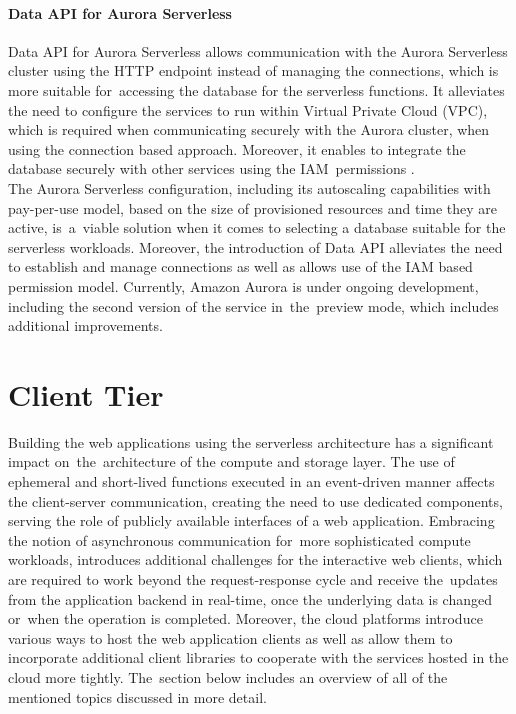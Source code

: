 \paragraph{Data API for Aurora Serverless}

Data API for Aurora Serverless allows communication with the Aurora Serverless cluster using the HTTP endpoint instead of managing the connections, which is more suitable for~accessing the database for the serverless functions.
It alleviates the need to configure the services to run within Virtual Private Cloud (VPC), which is required when communicating securely with the Aurora cluster, when using the connection based approach.
Moreover, it enables to integrate the database securely with other services using the IAM~permissions \cite{AuroraServerlessDataAPI}. \\

The Aurora Serverless configuration, including its autoscaling capabilities with pay-per-use model, based on the size of provisioned resources and time they are active, is~a~viable solution when it comes to selecting a database suitable for the serverless workloads.
Moreover, the introduction of Data API alleviates the need to establish and manage connections as well as allows use of the IAM based permission model.
Currently, Amazon Aurora is under ongoing development, including the second version of the service in~the~preview mode, which includes additional improvements.

\newpage

\section{Client Tier}

Building the web applications using the serverless architecture has a significant impact on~the~architecture of the compute and storage layer.
The use of ephemeral and short-lived functions executed in an event-driven manner affects the client-server communication, creating the need to use dedicated components, serving the role of publicly available interfaces of a web application.
Embracing the notion of asynchronous communication for~more sophisticated compute workloads, introduces additional challenges for the interactive web clients, which are required to work beyond the request-response cycle and receive the~updates from the application backend in real-time, once the underlying data is changed or~when the operation is completed.
Moreover, the cloud platforms introduce various ways to host the web application clients as well as allow them to incorporate additional client libraries to cooperate with the services hosted in the cloud more tightly.
The~section below includes an overview of all of the mentioned topics discussed in more detail.

